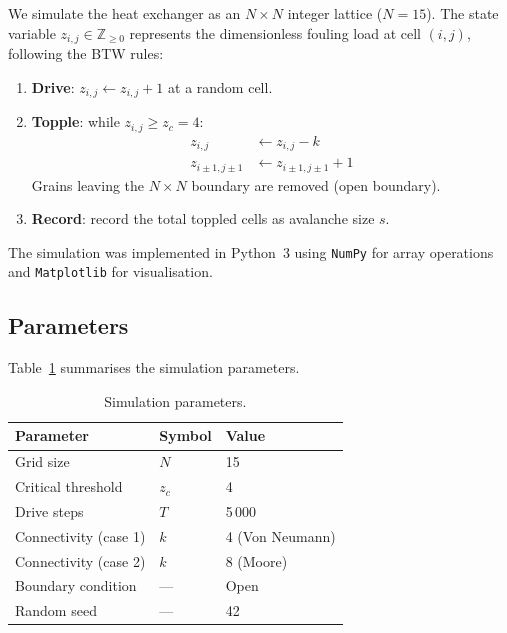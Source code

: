 \documentclass[10pt,a4paper,twocolumn]{article}
\begin{document}
We simulate the heat exchanger as an $N\times N$ integer lattice ($N=15$).
The state variable $z_{i,j}\in\mathbb{Z}_{\geq0}$ represents the
dimensionless fouling load at cell $(i,j)$, following the BTW rules:
\begin{enumerate}
  \item \textbf{Drive}: $z_{i,j}\leftarrow z_{i,j}+1$ at a random cell.
  \item \textbf{Topple}: while $z_{i,j}\geq z_c=4$:
        \begin{align}
          z_{i,j}         &\leftarrow z_{i,j}-k \label{eq:topple_self}\\
          z_{i\pm1,j\pm1} &\leftarrow z_{i\pm1,j\pm1}+1 \label{eq:topple_nbr}
        \end{align}
        Grains leaving the $N\times N$ boundary are removed (open boundary).
  \item \textbf{Record}: record the total toppled cells as avalanche size $s$.
\end{enumerate}

The simulation was implemented in Python~3 using \texttt{NumPy} for array
operations and \texttt{Matplotlib} for visualisation.

\subsection{Parameters}

Table~\ref{tab:params} summarises the simulation parameters.

\begin{table}[H]
  \centering
  \caption{Simulation parameters.}
  \label{tab:params}
  \small
  \begin{tabular}{lll}
    \toprule
    Parameter & Symbol & Value \\
    \midrule
    Grid size             & $N$    & 15 \\
    Critical threshold    & $z_c$  & 4 \\
    Drive steps           & $T$    & 5\,000 \\
    Connectivity (case 1) & $k$    & 4 (Von Neumann) \\
    Connectivity (case 2) & $k$    & 8 (Moore) \\
    Boundary condition    & ---    & Open \\
    Random seed           & ---    & 42 \\
    \bottomrule
  \end{tabular}
\end{table}
\end{document}
